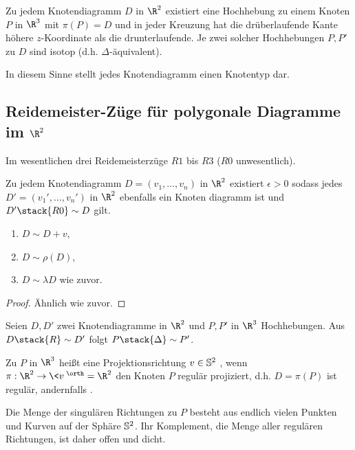 \begin{lem}
    Zu jedem Knotendiagramm $D$ in $\R^2$ existiert eine Hochhebung zu einem Knoten $P$ in $\R^3$ mit $\pi(P) = D$ und in jeder Kreuzung hat die drüberlaufende Kante höhere $z$-Koordinate als die drunterlaufende.
    Je zwei solcher Hochhebungen $P, P'$ zu $D$ sind isotop (d.h. $\Delta$-äquivalent).
\end{lem}

In diesem Sinne stellt jedes Knotendiagramm einen Knotentyp dar.


\subsection{Reidemeister-Züge für polygonale Diagramme im \texorpdfstring{$\R^2$}{ℝ²}}


Im wesentlichen drei Reidemeisterzüge $R1$ bis $R3$ ($R0$ unwesentlich).

\begin{lem}
    Zu jedem Knotendiagramm $D = (v_1, \dotsc, v_n)$ in $\R^2$ existiert $\epsilon > 0$ sodass jedes $D' = (v_1', \dotsc, v_n')$ in $\R^2$ ebenfalls ein Knoten diagramm ist und $D' \stack{R0}\sim D$ gilt.
    \begin{enumerate}[(1)]
        \item
            $D \sim D + v$,
        \item
            $D \sim \rho(D)$,
        \item
            $D \sim \lambda D$ wie zuvor.
    \end{enumerate}
    \begin{proof}
        Ähnlich wie zuvor.
    \end{proof}
\end{lem}

\begin{lem}
    Seien $D, D'$ zwei Knotendiagramme in $\R^2$ und $P, P'$ in $\R^3$ Hochhebungen.
    Aus $D \stack{R}\sim D'$ folgt $P \stack{\Delta}\sim P'$.
\end{lem}

\begin{df}
    Zu $P$ in $\R^3$ heißt eine Projektionsrichtung $v \in \S^2$ , wenn $\pi: \R^2 \to \<v\>^\orth \homeomorphic \R^2$ den Knoten $P$ regulär projiziert, d.h. $D = \pi(P)$ ist regulär, andernfalls .
\end{df}

\begin{lem}
    Die Menge der singulären Richtungen zu $P$ besteht aus endlich vielen Punkten und Kurven auf der Sphäre $\S^2$.
    Ihr Komplement, die Menge aller regulären Richtungen, ist daher offen und dicht.
\end{lem}


